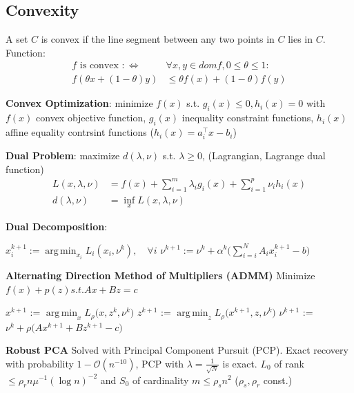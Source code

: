 \documentclass[a4paper,landscape,10pt]{article}
\renewcommand*{\O}[0] {\ensuremath{\mathcal{O}}}
\DeclareMathOperator*{\argmin}{arg\,min}
\begin{document}
\begin{multicols}{4}
\subsection{Convexity}
A set $C$ is convex if the line segment between any two points in $C$ lies in
$C$. Function:
\begin{align*}
    f \text{ is convex } :\Leftrightarrow \quad &\forall x,y \in dom f, 0
    \leq \theta \leq 1: \\
    f( \theta x + (1 - \theta) y) & \leq \theta f(x) + (1 - \theta) f(y)
\end{align*}

{\bf Convex Optimization}: minimize $f(x)$ s.t. $g_i(x) \leq 0, h_i(x) = 0$
with $f(x)$ convex objective function, $g_i(x)$ inequality constraint functions,
$h_i(x)$ affine equality contrsint functions ($h_i(x) = a_i^\top x - b_i$)

{\bf Dual Problem}:
maximize $d(\lambda, \nu)$ s.t.
$\lambda \geq 0$, (Lagrangian, Lagrange dual function)
\begin{align*}
L(x, \lambda, \nu) 
&= f(x) + \sum_{i=1}^{m} \lambda_i g_i(x) + \sum_{i=1}^p \nu_i h_i(x) \\
d(\lambda, \nu) &= \inf_x L(x, \lambda, \nu)
\end{align*}

{\bf Dual Decomposition}:
\begin{algorithmic}
 \State $x_i^{k+1} := \argmin_{x_i} L_i(x_i, \nu^k), \quad \forall i$
 \State $\nu^{k+1} := \nu^k + \alpha^k \Big(\sum_{i=i}^N A_i x_i^{k+1} - b \Big)$
\end{algorithmic}


{\bf Alternating Direction Method of Multipliers (ADMM)} Minimize $f(x) + p(z)
s.t.
Ax + Bz = c$

\begin{algorithmic}
    \State $x^{k+1}$     := $\argmin_x L_\rho \big(x, z^k, \nu^k \big)$
    \State $z^{k+1}$     := $\argmin_z L_\rho \big(x^{k+1}, z, \nu^k \big)$
    \State $\nu^{k+1}$   := $\nu^k + \rho \big(Ax^{k+1} + Bz^{k+1} - c \big)$
\end{algorithmic}

{\bf Robust PCA} Solved with Principal Component Pursuit (PCP). Exact recovery
with probability $1 - \O(n^{-10})$, PCP with $\lambda = \frac{1}{\sqrt{N}}$ is
exact. $L_0$ of rank $\leq \rho_r n\mu^{-1} (\log n) ^{-2}$ and $S_0$ of
cardinality $m \leq \rho_s n^2$ ($\rho_s, \rho_r$ const.)

\clearpage
\end{multicols}
\end{document}
